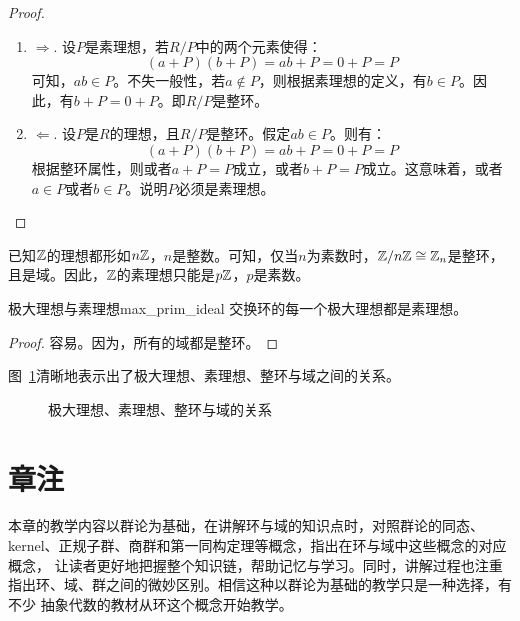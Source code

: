 \begin{proof}
\begin{enumerate}
\item $\Rightarrow$. 设$P$是素理想，若$R/P$中的两个元素使得：
\[(a + P) (b + P) = ab + P = 0 + P = P\]
可知，$ab \in P$。不失一般性，若$a \notin P$，则根据素理想的定义，有$b \in P$。因此，有$b + P = 0 + P$。即$R/P$是整环。

\item $\Leftarrow$. 设$P$是$R$的理想，且$R/P$是整环。假定$ab \in P$。则有：
\[(a + P) (b + P) = ab + P = 0 + P = P\]
根据整环属性，则或者$a + P = P$成立，或者$b + P = P$成立。这意味着，或者$a \in P$或者$b \in P$。说明$P$必须是素理想。
\end{enumerate}
\end{proof}

\begin{example}
已知${\mathbb Z}$的理想都形如$n {\mathbb Z}$，$n$是整数。可知，仅当$n$为素数时，${\mathbb Z} / n {\mathbb Z} \cong {\mathbb Z}_n$是整环，且是域。因此，${\mathbb Z}$的素理想只能是$p {\mathbb Z}$，$p$是素数。
\end{example}

\begin{corollary}{极大理想与素理想}{max_prim_ideal}
交换环的每一个极大理想都是素理想。
\end{corollary}

\begin{proof}
容易。因为，所有的域都是整环。
\end{proof}

图~\ref{fig:maximal-prime-ideal-relations}清晰地表示出了极大理想、素理想、整环与域之间的关系。

\begin{figure}[htbp]
  \centering
  
  \caption{极大理想、素理想、整环与域的关系}
  \label{fig:maximal-prime-ideal-relations}
\end{figure}

 \section*{章注}
 本章的教学内容以群论为基础，在讲解环与域的知识点时，对照群论的同态、kernel、正规子群、商群和第一同构定理等概念，指出在环与域中这些概念的对应概念，
 让读者更好地把握整个知识链，帮助记忆与学习。同时，讲解过程也注重指出环、域、群之间的微妙区别。相信这种以群论为基础的教学只是一种选择，有不少
 抽象代数的教材从环这个概念开始教学。
 
